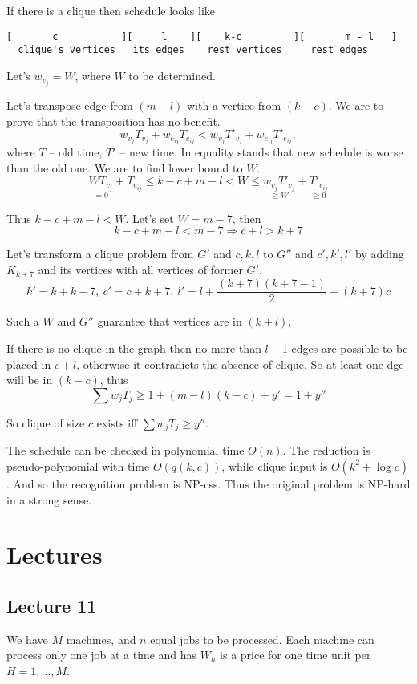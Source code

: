 \documentclass{amsart}
\begin{document}
If there is a clique then schedule looks like
\begin{verbatim}
[       c           ][     l    ][    k-c         ][       m - l   ]
  clique's vertices   its edges    rest vertices     rest edges
\end{verbatim}

Let's $w_{v_j}=W$, where $W$ to be determined.

Let's transpose edge from $(m-l)$ with a vertice from $(k-c)$.
We are to prove that the transposition has no benefit.
\[
  w_{v_j}T_{v_j} + w_{e_{ij}}T_{e_{ij}} <
    w_{v_j}T'_{v_j} + w_{e_{ij}}T'_{e_{ij}},
\]
where $T$ -- old time, $T'$ -- new time. In equality stands that
new schedule is worse than the old one. We are to find lower bound to $W$.
\[
  \underset{=0}
    {WT_{v_j}} +
  T_{e_{ij}} \leqslant k - c + m - l <
    W \leqslant
      \underset{\geqslant W}
        { w_{v_j} T'_{v_j} } +
      \underset{\geqslant 0}
        { T'_{e_{ij}} }
\]

Thus $k-c+m-l < W$. Let's set $W=m-7$, then
\[
  k - c + m - l < m - 7 \Rightarrow c + l > k + 7
\]

Let's transform a clique problem from $G'$ and $c,k,l$ to
$G''$ and $c',k',l'$ by adding $K_{k+7}$ and its vertices with
all vertices of former $G'$.
\[
  k' = k + k + 7,\ c' = c + k + 7,
  \ l' = l + \frac{(k+7)(k+7-1)}{2} + (k+7)c
\]

Such a $W$ and $G''$ guarantee that vertices are in $(k+l)$.

If there is no clique in the graph then no more than $l-1$ edges
are possible to be placed in $c+l$, otherwise it contradicts the absence
of clique. So at least one dge will be in $(k-c)$, thus
\[
  \sum w_jT_j \geqslant 1 + (m-l)(k-c) + y' = 1 + y''
\]

So clique of size $c$ exists iff $\sum w_jT_j \geqslant y''$.

The schedule can be checked in polynomial time $O(n)$.
The reduction is pseudo-polynomial with time $O(q(k,c))$, while
clique input is $O(k^2+ \log c)$. And so the recognition problem is NP-css.
Thus the original problem is NP-hard in a strong sense.

\section{Lectures}

\subsection{Lecture 11}
We have $M$ machines, and $n$ equal jobs to be processed.
Each machine can process only one job at a time and has $W_h$ is a price
for one time unit per $H=1,\dots,M$.
\end{document}
